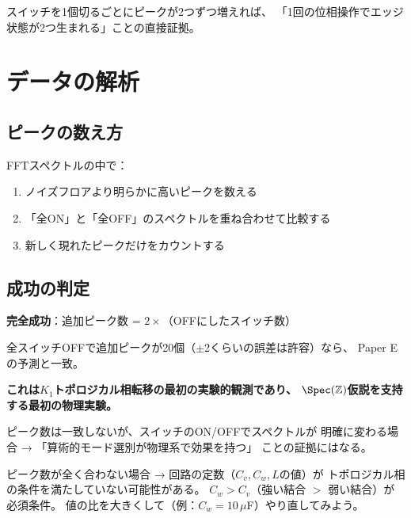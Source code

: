 \documentclass[12pt,a4paper]{article}
\begin{document}
スイッチを1個切るごとにピークが2つずつ増えれば、
「1回の位相操作でエッジ状態が2つ生まれる」ことの直接証拠。

\section{データの解析}

\subsection{ピークの数え方}

FFTスペクトルの中で：
\begin{enumerate}
\item ノイズフロアより明らかに高いピークを数える
\item 「全ON」と「全OFF」のスペクトルを重ね合わせて比較する
\item 新しく現れたピークだけをカウントする
\end{enumerate}

\subsection{成功の判定}

\begin{successbox}
\textbf{完全成功}：追加ピーク数 = $2 \times$（OFFにしたスイッチ数）

全スイッチOFFで追加ピークが20個（$\pm$2くらいの誤差は許容）なら、
Paper Eの予測と一致。

\textbf{これは$K_1$トポロジカル相転移の最初の実験的観測であり、
$\Spec(\mathbb{Z})$仮説を支持する最初の物理実験。}
\end{successbox}

\begin{keybox}[部分的成功]
ピーク数は一致しないが、スイッチのON/OFFでスペクトルが
明確に変わる場合 → 「算術的モード選別が物理系で効果を持つ」
ことの証拠にはなる。
\end{keybox}

\begin{warnbox}
ピーク数が全く合わない場合 → 回路の定数（$C_v, C_w, L$の値）が
トポロジカル相の条件を満たしていない可能性がある。
$C_w > C_v$（強い結合 $>$ 弱い結合）が必須条件。
値の比を大きくして（例：$C_w = 10\,\mu$F）やり直してみよう。
\end{warnbox}
\end{document}
